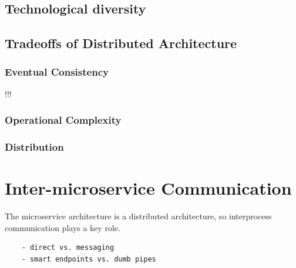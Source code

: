 \documentclass[thesis=M,english,hidelinks]{FITthesis}[2012/10/20]
\begin{document}
\subsection{Technological diversity}


\subsection{Tradeoffs of Distributed Architecture}
\subsubsection{Eventual Consistency}
!!!
\subsubsection{Operational Complexity}
\subsubsection{Distribution}




% 
% 

\section{Inter-microservice Communication}
The microservice architecture is a distributed architecture, so interprocess communication plays a key role.
\begin{verbatim}
    - direct vs. messaging
    - smart endpoints vs. dumb pipes
\end{verbatim}
\end{document}
